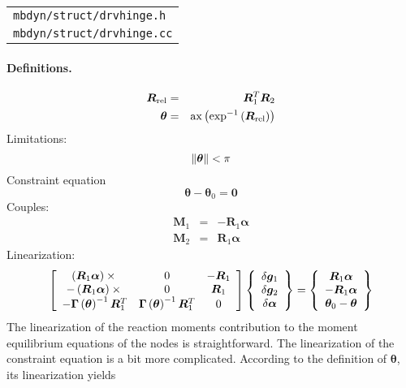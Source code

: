 \documentclass[10pt,fleqn,subeqn]{report}
\newcommand{\T}[1]{\bm{#1}}
\begin{document}
\begin{tabular}{l}
\texttt{mbdyn/struct/drvhinge.h} \\
\texttt{mbdyn/struct/drvhinge.cc}
\end{tabular}

\paragraph{Definitions.}
\begin{eqnarray*}
	\T{R}_{\text{rel}} & = & \T{R}_1^T \T{R}_2 \\
	\T{\theta} & = & \llk{ax}\plbr{\llk{exp}^{-1}\plbr{\T{R}_{\text{rel}}}}
\end{eqnarray*}
Limitations:
\begin{equation}
	\nrbr{\T{\theta}} < \pi
\end{equation}
Constraint equation 
\begin{equation}
	\T{\theta} - \T{\theta}_0 = \T{0}
\end{equation}
Couples:
\begin{eqnarray*}
	\T{M}_1 & = & -\T{R}_1 \T{\alpha} \\
	\T{M}_2 & = & \T{R}_1 \T{\alpha}
\end{eqnarray*}
Linearization:
\begin{equation}
	\sqbr{\matr{ccc}{
		\plbr{\T{R}_1 \T{\alpha}}\times{} & 0 & -\T{R}_1 \\
		-\plbr{\T{R}_1 \T{\alpha}}\times{} & 0 & \T{R}_1 \\
		-\T{\Gamma}\plbr{\T{\theta}}^{-1} \T{R}_1^T &
			\T{\Gamma}\plbr{\T{\theta}}^{-1} \T{R}_1^T & 0
	}}\cubr{\cvvect{
		\delta\T{g}_1 \\
		\delta\T{g}_2 \\
		\delta\T{\alpha} \\
	}} = \cubr{\cvvect{
		\T{R}_1 \T{\alpha} \\
		-\T{R}_1 \T{\alpha} \\
		\T{\theta}_0 - \T{\theta}
	}}
\end{equation}
The linearization of the reaction moments contribution 
to the moment equilibrium equations of the nodes is straightforward.
The linearization of the constraint equation is a bit more complicated.
According to the definition of $\T{\theta}$, its linearization
yields
\end{document}
